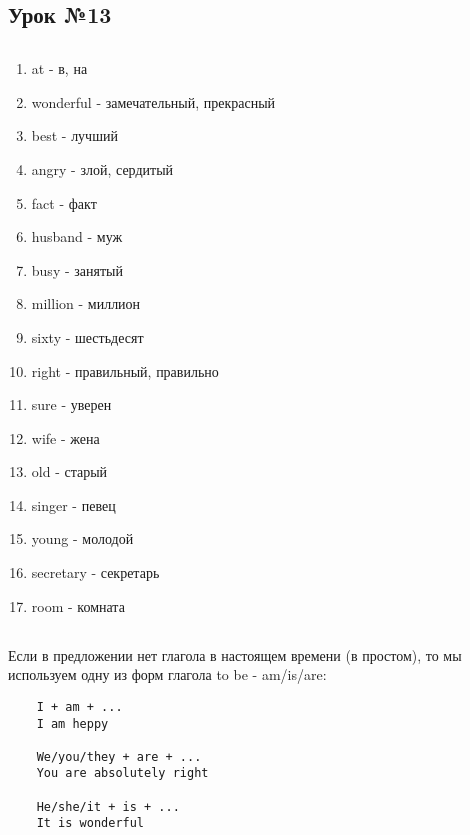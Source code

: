\subsection{Урок №13}

\subsection*{}
\begin{multicols}{2}
    \begin{enumerate}\setlength{\itemsep}{0pt}
        \item at - в, на
        \item wonderful - замечательный, прекрасный
        \item best - лучший
        \item angry - злой, сердитый
        \item fact - факт
        \item husband - муж
        \item busy - занятый
        \item million - миллион
        \item sixty - шестьдесят
        \item right - правильный, правильно
        \item sure - уверен
        \item wife - жена
        \item old - старый
        \item singer - певец
        \item young - молодой
        \item secretary - секретарь
        \item room - комната
    \end{enumerate}
\end{multicols}

\subsection*{}
Если в предложении нет глагола в настоящем времени (в простом), то мы используем одну из форм глагола
to be - am/is/are:
\begin{verbatim}
    I + am + ...
    I am heppy

    We/you/they + are + ...
    You are absolutely right

    He/she/it + is + ...
    It is wonderful
\end{verbatim}